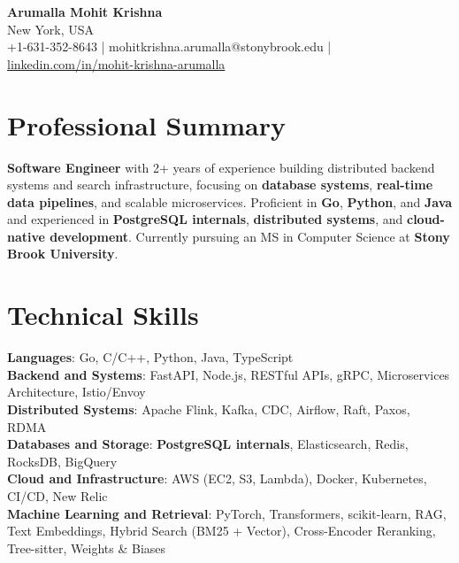 \documentclass[letterpaper,11pt]{article}
\begin{document}
\begin{center}
  {\Large \textbf{Arumalla Mohit Krishna}} \\
  New York, USA \\
  +1-631-352-8643 \enspace | \enspace mohitkrishna.arumalla@stonybrook.edu \enspace | \enspace \href{https://www.linkedin.com/in/mohit-krishna-arumalla}{linkedin.com/in/mohit-krishna-arumalla}
\end{center}

\section{Professional Summary}
  \begin{itemize}[leftmargin=0.15in, label={}]
    \small{\item{
     \textbf{Software Engineer} with 2+ years of experience building distributed backend systems and search infrastructure, focusing on \textbf{database systems}, \textbf{real-time data pipelines}, and scalable microservices. Proficient in \textbf{Go}, \textbf{Python}, and \textbf{Java} and experienced in \textbf{PostgreSQL internals}, \textbf{distributed systems}, and \textbf{cloud-native development}. Currently pursuing an MS in Computer Science at \textbf{Stony Brook University}.
    }}
  \end{itemize}
\vspace{-16pt}

\section{Technical Skills}
 \begin{itemize}[leftmargin=0.15in, label={}]
    \small{\item{
     \textbf{Languages}: Go, C/C++, Python, Java, TypeScript \\
     \textbf{Backend and Systems}: FastAPI, Node.js, RESTful APIs, gRPC, Microservices Architecture, Istio/Envoy \\
     \textbf{Distributed Systems}: Apache Flink, Kafka, CDC, Airflow, Raft, Paxos, RDMA \\
     \textbf{Databases and Storage}: \textbf{PostgreSQL internals}, Elasticsearch, Redis, RocksDB, BigQuery \\
     \textbf{Cloud and Infrastructure}: AWS (EC2, S3, Lambda), Docker, Kubernetes, CI/CD, New Relic \\
     \textbf{Machine Learning and Retrieval}: PyTorch, Transformers, scikit-learn, RAG, Text Embeddings, Hybrid Search (BM25 + Vector), Cross-Encoder Reranking, Tree-sitter, Weights \& Biases
    }}
 \end{itemize}
\vspace{-16pt}
\end{document}
